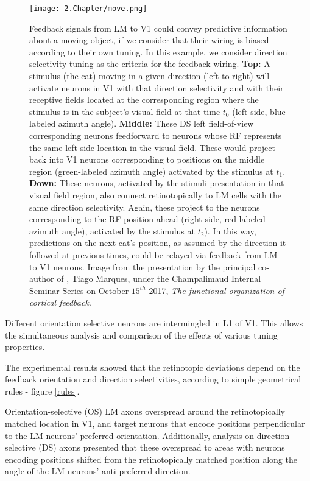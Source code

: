 \begin{figure}[h]
\center
\texttt{[image: 2.Chapter/move.png]}
\caption{Feedback signals from LM to V1 could convey predictive information about a moving object, if we consider that their wiring is biased according to their own tuning. In this example, we consider direction selectivity tuning as the criteria for the feedback wiring. \newline \textbf{Top:} A stimulus (the cat) moving in a given direction (left to right) will activate neurons in V1 with that direction selectivity and with their receptive fields located at the corresponding region where the stimulus is in the subject's visual field at that time $t_0$ (left-side, blue labeled azimuth angle). \newline \textbf{Middle:} These DS left field-of-view corresponding neurons feedforward to neurons whose RF represents the same left-side location in the visual field. These would project back into V1 neurons corresponding to positions on the middle region (green-labeled azimuth angle) activated by the stimulus at $t_1$. \newline \textbf{Down: } These neurons, activated by the stimuli presentation in that visual field region, also connect retinotopically to LM cells with the same direction selectivity. Again, these project to the neurons corresponding to the RF position ahead (right-side, red-labeled azimuth angle), activated by the stimulus at $t_2$). \newline In this way, predictions on the next cat's position, as assumed by the direction it followed at previous times, could be relayed via feedback from LM to V1 neurons.
\newline \newline \tiny{Image from the presentation by the principal co-author of \cite{Tiago}, Tiago Marques, under the Champalimaud Internal Seminar Series on October $15^{th}$ 2017, \textit{The functional organization of cortical feedback}.}\label{cat}} 
\label{move}
\end{figure}

Different orientation selective neurons are intermingled in L1 of V1. This allows the simultaneous analysis and comparison of the effects of various tuning properties.

The experimental results showed that the retinotopic deviations depend on the feedback orientation and direction selectivities, according to simple geometrical rules - figure \ref{rules}.

Orientation-selective (OS) LM axons overspread around the retinotopically matched location in V1, and target neurons that encode positions perpendicular to the LM neurons' preferred orientation. Additionally, analysis on direction-selective (DS) axons presented that these overspread to areas with neurons encoding positions shifted from the retinotopically matched position along the angle of the LM neurons' anti-preferred direction. 


